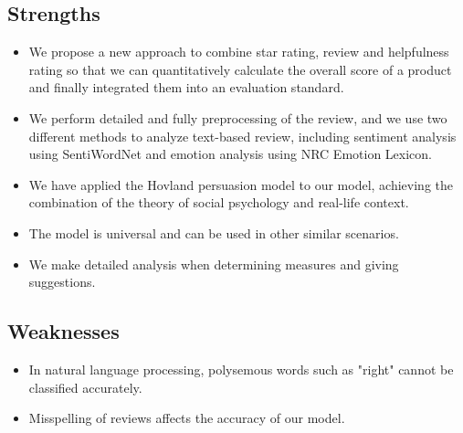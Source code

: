 \documentclass[12pt]{article}  %
\begin{document}
\subsection{Strengths}
\begin{itemize}
    \item We propose a new approach to combine star rating, review and helpfulness rating so that we can quantitatively calculate the overall score of a product and finally integrated them into an evaluation standard.
    
    \item  We perform detailed and fully preprocessing of the review, and we use two different methods to analyze text-based review, including sentiment analysis using SentiWordNet and emotion analysis using NRC Emotion Lexicon.
    
    \item  We have applied the Hovland persuasion model to our model, achieving the combination of the theory of social psychology and real-life context.
    
    \item The model is universal and can be used in other similar scenarios.
    
    \item  We make detailed analysis when determining measures and giving suggestions.
    
    
\end{itemize}

\subsection{Weaknesses}
\begin{itemize}
    \item  In natural language processing, polysemous words such as "right" cannot be classified accurately.
    \item  Misspelling of reviews affects the accuracy of our model.
    
 \end{itemize}
\end{document}
